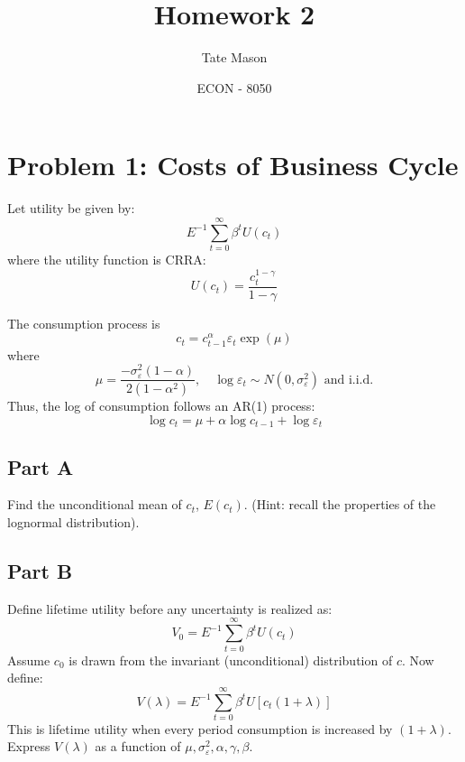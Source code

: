 \documentclass[10pt,a4paper]{article}
\title{Homework 2}
\author{Tate Mason}
\date{ECON - 8050}
\begin{document}
\maketitle

\section*{Problem 1: Costs of Business Cycle}
  Let utility be given by:
  \begin{equation*}
      E^{-1} \sum_{t=0}^{\infty} \beta^t U(c_t)
  \end{equation*}
  where the utility function is CRRA:
  \begin{equation*}
      U(c_t) = \frac{c_t^{1-\gamma}}{1- \gamma}
  \end{equation*}

  The consumption process is
  \begin{equation*}
      c_t = c_{t-1}^{\alpha} \varepsilon_t \exp(\mu)
  \end{equation*}
  where
  \begin{equation*}
      \mu = \frac{-\sigma_{\varepsilon}^2 (1-\alpha)}{2 (1-\alpha^2)}, \quad \log \varepsilon_t \sim N(0, \sigma_{\varepsilon}^2) \text{ and i.i.d.}
  \end{equation*}
  Thus, the log of consumption follows an AR(1) process:
  \begin{equation*}
      \log c_t = \mu + \alpha \log c_{t-1} + \log \varepsilon_t
  \end{equation*}

  \subsection*{Part A}
    Find the unconditional mean of $c_t$, $E(c_t)$. (Hint: recall the properties of the lognormal distribution).

  \subsection*{Part B}
    Define lifetime utility before any uncertainty is realized as:
    \begin{equation*}
        V_0 = E^{-1} \sum_{t=0}^{\infty} \beta^t U(c_t)
    \end{equation*}
    Assume $c_0$ is drawn from the invariant (unconditional) distribution of $c$.
    Now define:
    \begin{equation*}
        V(\lambda) = E^{-1} \sum_{t=0}^{\infty} \beta^t U [c_t(1 + \lambda)]
    \end{equation*}
    This is lifetime utility when every period consumption is increased by $(1+\lambda)$. Express $V(\lambda)$ as a function of $\mu, \sigma_{\varepsilon}^2, \alpha, \gamma, \beta$.
\end{document}
